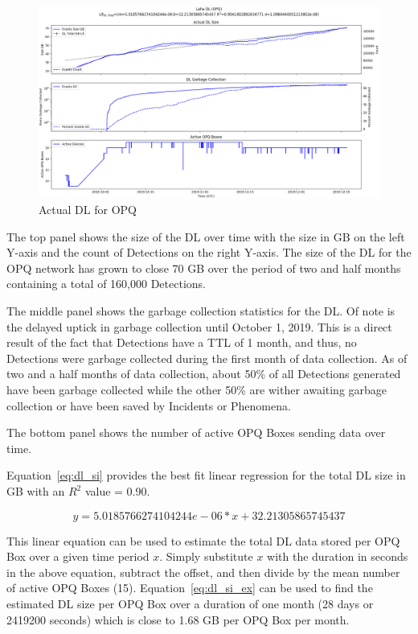 \begin{figure}[H]
    \centering
    \includegraphics[width=\linewidth]{figures/actual_dl_opq.png}
    \caption{Actual DL for OPQ}
    \label{fig:actual_dl_opq}
\end{figure}

The top panel shows the size of the DL over time with the size in GB on the left Y-axis and the count of Detections on the right Y-axis. The size of the DL for the OPQ network has grown to close 70 GB over the period of two and half months containing a total of 160,000 Detections.

The middle panel shows the garbage collection statistics for the DL. Of note is the delayed uptick in garbage collection until October 1, 2019. This is a direct result of the fact that Detections have a TTL of 1 month, and thus, no Detections were garbage collected during the first month of data collection. As of two and a half months of data collection, about 50\% of all Detections generated have been garbage collected while the other 50\% are wither awaiting garbage collection or have been saved by Incidents or Phenomena.

The bottom panel shows the number of active OPQ Boxes sending data over time.

Equation~\ref{eq:dl_si} provides the best fit linear regression for the total DL size in GB with an $R^2$ value = 0.90.

\begin{equation}
    y = 5.0185766274104244e-06 * x + 32.21305865745437
    \label{eq:dl_si}
\end{equation}

This linear equation can be used to estimate the total DL data stored per OPQ Box over a given time period $x$. Simply substitute $x$ with the duration in seconds in the above equation, subtract the offset, and then divide by the mean number of active OPQ Boxes (15). Equation~\ref{eq:dl_si_ex} can be used to find the estimated DL size per OPQ Box over a duration of one month (28 days or 2419200 seconds) which is close to 1.68 GB per OPQ Box per month.

